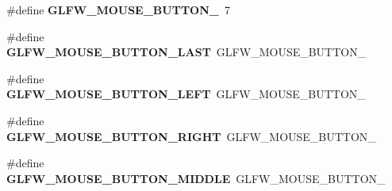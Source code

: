 \begin{DoxyCompactItemize}
\item 
\hypertarget{group__buttons_ga35d5c4263e0dc0d0a4731ca6c562f32c}{\#define {\bfseries \-G\-L\-F\-W\-\_\-\-M\-O\-U\-S\-E\-\_\-\-B\-U\-T\-T\-O\-N\-\_}~7}\label{group__buttons_ga35d5c4263e0dc0d0a4731ca6c562f32c}

\item 
\hypertarget{group__buttons_gab1fd86a4518a9141ec7bcde2e15a2fdf}{\#define {\bfseries \-G\-L\-F\-W\-\_\-\-M\-O\-U\-S\-E\-\_\-\-B\-U\-T\-T\-O\-N\-\_\-\-L\-A\-S\-T}~\-G\-L\-F\-W\-\_\-\-M\-O\-U\-S\-E\-\_\-\-B\-U\-T\-T\-O\-N\-\_}\label{group__buttons_gab1fd86a4518a9141ec7bcde2e15a2fdf}

\item 
\hypertarget{group__buttons_gaf37100431dcd5082d48f95ee8bc8cd56}{\#define {\bfseries \-G\-L\-F\-W\-\_\-\-M\-O\-U\-S\-E\-\_\-\-B\-U\-T\-T\-O\-N\-\_\-\-L\-E\-F\-T}~\-G\-L\-F\-W\-\_\-\-M\-O\-U\-S\-E\-\_\-\-B\-U\-T\-T\-O\-N\-\_}\label{group__buttons_gaf37100431dcd5082d48f95ee8bc8cd56}

\item 
\hypertarget{group__buttons_ga3e2f2cf3c4942df73cc094247d275e74}{\#define {\bfseries \-G\-L\-F\-W\-\_\-\-M\-O\-U\-S\-E\-\_\-\-B\-U\-T\-T\-O\-N\-\_\-\-R\-I\-G\-H\-T}~\-G\-L\-F\-W\-\_\-\-M\-O\-U\-S\-E\-\_\-\-B\-U\-T\-T\-O\-N\-\_}\label{group__buttons_ga3e2f2cf3c4942df73cc094247d275e74}

\item 
\hypertarget{group__buttons_ga34a4d2a701434f763fd93a2ff842b95a}{\#define {\bfseries \-G\-L\-F\-W\-\_\-\-M\-O\-U\-S\-E\-\_\-\-B\-U\-T\-T\-O\-N\-\_\-\-M\-I\-D\-D\-L\-E}~\-G\-L\-F\-W\-\_\-\-M\-O\-U\-S\-E\-\_\-\-B\-U\-T\-T\-O\-N\-\_}\label{group__buttons_ga34a4d2a701434f763fd93a2ff842b95a}

\end{DoxyCompactItemize}
